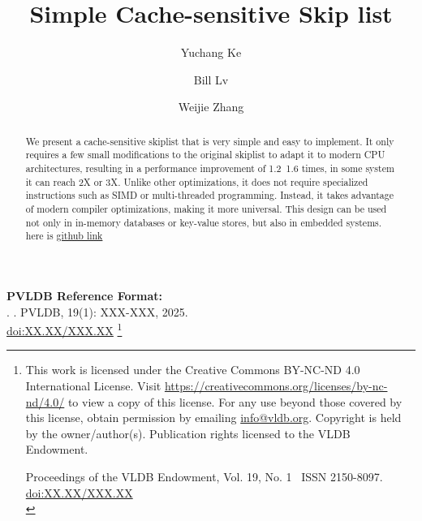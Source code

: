 \documentclass[sigconf, nonacm, letterpaper,top=2cm,bottom=2cm,left=3cm,right=3cm,marginparwidth=1.75cm]{acmart}
\newcommand\vldbdoi{XX.XX/XXX.XX}
\newcommand\vldbpages{XXX-XXX}
\newcommand\vldbvolume{19}
\newcommand\vldbissue{1}
\newcommand\vldbyear{2025}
\newcommand\vldbauthors{\authors}
\newcommand\vldbtitle{\shorttitle}
\newcommand\vldbpagestyle{plain}
\begin{document}
\title{Simple Cache-sensitive Skip list}

\author{Yuchang Ke}

\author{Bill Lv}

\author{Weijie Zhang}

\begin{abstract}
      We present a cache-sensitive skiplist that is very simple and easy to implement. It only requires a few small modifications to the original skiplist to adapt it to modern CPU architectures, resulting in a performance improvement of 1.2~1.6 times, in some system it can reach 2X or 3X.
      Unlike other optimizations, it does not require specialized instructions such as SIMD or multi-threaded programming. Instead, it takes advantage of modern compiler optimizations, making it more universal. This design can be used not only in in-memory databases or key-value stores, but also in embedded systems.  here is \href{https://github.com/acekingke/simpleCacheSentiveSkiplist}{github link}

\end{abstract}

\maketitle

\pagestyle{\vldbpagestyle}
\begingroup\small\noindent\raggedright\textbf{PVLDB Reference Format:}\\
\vldbauthors. \vldbtitle. PVLDB, \vldbvolume(\vldbissue): \vldbpages, \vldbyear.\\
\href{https://doi.org/\vldbdoi}{doi:\vldbdoi}
\endgroup
\begingroup
\renewcommand\thefootnote{}\footnote{\noindent
This work is licensed under the Creative Commons BY-NC-ND 4.0 International License. Visit \url{https://creativecommons.org/licenses/by-nc-nd/4.0/} to view a copy of this license. For any use beyond those covered by this license, obtain permission by emailing \href{mailto:info@vldb.org}{info@vldb.org}. Copyright is held by the owner/author(s). Publication rights licensed to the VLDB Endowment. \\
\raggedright Proceedings of the VLDB Endowment, Vol. \vldbvolume, No. \vldbissue\ %
ISSN 2150-8097. \\
\href{https://doi.org/\vldbdoi}{doi:\vldbdoi} \\
}\addtocounter{footnote}{-1}\endgroup
\end{document}
